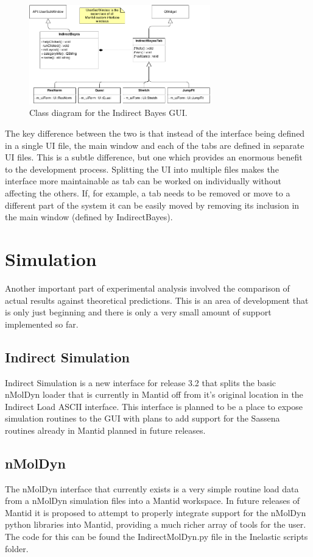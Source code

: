 \documentclass[paper=a4, fontsize=11pt]{scrartcl}	%
\numberwithin{equation}{section}															%
\numberwithin{figure}{section}																%
\numberwithin{table}{section}																%
\begin{document}
\begin{figure}[H]
\centering
\includegraphics[width=0.7\textwidth]{img/uml/class_diagrams/Bayes_structure.png}
\caption{Class diagram for the Indirect Bayes GUI.}
\label{fig:indirect-bayes-gui}
\end{figure}

The key difference between the two is that instead of the interface being defined in a single UI file, the main window and each of the tabs are defined in separate UI files. This is a subtle difference, but one which provides an enormous benefit to the development process. Splitting the UI into multiple files makes the interface more maintainable as tab can be worked on individually without affecting the others. If, for example, a tab needs to be removed or move to a different part of the system it can be easily moved by removing its inclusion in the main window (defined by IndirectBayes).

\section{Simulation}
\label{sec:simulation}
Another important part of experimental analysis involved the comparison of actual results against theoretical predictions. This is an area of development that is only just beginning and there is only a very small amount of support implemented so far.

\subsection{Indirect Simulation}
Indirect Simulation is a new interface for release 3.2 that splits the basic nMolDyn loader that is currently in Mantid off from it's original location in the Indirect Load ASCII interface. This interface is planned to be a place to expose simulation routines to the GUI with plans to add support for the Sassena routines already in Mantid planned in future releases.

\subsection{nMolDyn}
The nMolDyn interface that currently exists is a very simple routine load data from a nMolDyn simulation files into a Mantid workspace. In future releases of Mantid it is proposed to attempt to properly integrate support for the nMolDyn python libraries into Mantid, providing a much richer array of tools for the user. The code for this can be found the IndirectMolDyn.py file in the Inelastic scripts folder.
\end{document}
